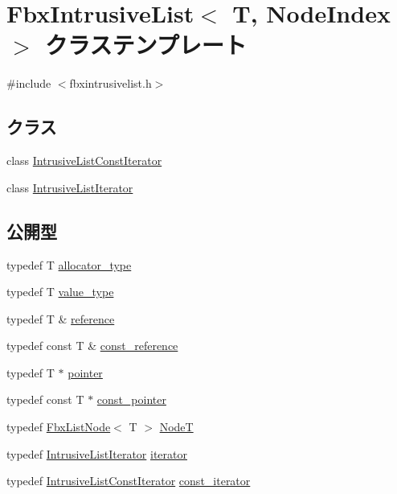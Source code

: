 \hypertarget{class_fbx_intrusive_list}{}\section{Fbx\+Intrusive\+List$<$ T, Node\+Index $>$ クラステンプレート}
\label{class_fbx_intrusive_list}


{\ttfamily \#include $<$fbxintrusivelist.\+h$>$}

\subsection*{クラス}
\begin{DoxyCompactItemize}
\item 
class \hyperlink{class_fbx_intrusive_list_1_1_intrusive_list_const_iterator}{Intrusive\+List\+Const\+Iterator}
\item 
class \hyperlink{class_fbx_intrusive_list_1_1_intrusive_list_iterator}{Intrusive\+List\+Iterator}
\end{DoxyCompactItemize}
\subsection*{公開型}
\begin{DoxyCompactItemize}
\item 
typedef T \hyperlink{class_fbx_intrusive_list_a25910b7e87998a2f60ec5762b254bff8}{allocator\+\_\+type}
\item 
typedef T \hyperlink{class_fbx_intrusive_list_a218aebbf21a304ade2a570f47da62751}{value\+\_\+type}
\item 
typedef T \& \hyperlink{class_fbx_intrusive_list_aa927f048081371fe74dff673d3a5a8ad}{reference}
\item 
typedef const T \& \hyperlink{class_fbx_intrusive_list_a21904cb72c0ccae9d5c0b9f171befeb8}{const\+\_\+reference}
\item 
typedef T $\ast$ \hyperlink{class_fbx_intrusive_list_ad04ad10d67ddd0d4104b172839c908d7}{pointer}
\item 
typedef const T $\ast$ \hyperlink{class_fbx_intrusive_list_ae8232fd6a6ef678e5d5eed6ad978994c}{const\+\_\+pointer}
\item 
typedef \hyperlink{class_fbx_list_node}{Fbx\+List\+Node}$<$ T $>$ \hyperlink{class_fbx_intrusive_list_a6ffda382a6d029a042cbb0110853680c}{NodeT}
\item 
typedef \hyperlink{class_fbx_intrusive_list_1_1_intrusive_list_iterator}{Intrusive\+List\+Iterator} \hyperlink{class_fbx_intrusive_list_ae1012cd86e3ff0a4a49c982f0d34b4e7}{iterator}
\item 
typedef \hyperlink{class_fbx_intrusive_list_1_1_intrusive_list_const_iterator}{Intrusive\+List\+Const\+Iterator} \hyperlink{class_fbx_intrusive_list_a4c0c567c56a712e7ffca9c6bb5990169}{const\+\_\+iterator}
\end{DoxyCompactItemize}
